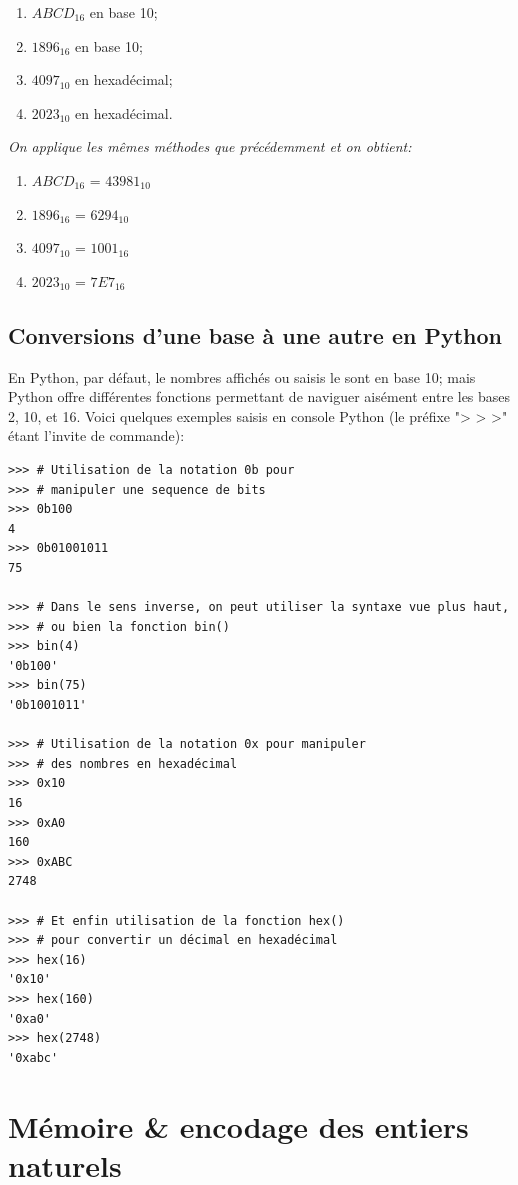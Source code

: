 \documentclass[12pt]{article}
\newenvironment{MaReponse}
		{\begin{greyedtextbox}\itshape} %
		{\end{greyedtextbox}}            %
\newenvironment{alphenum}
{\begin{enumerate}[label=\alph*.]}
	{\end{enumerate}}
\begin{document}
	 \begin{MonExo}
	 	\begin{alphenum}
	 		\item $ABCD_{16}$ en base 10;
	 		\item $1896_{16}$ en base 10;
	 		\item $4097_{10}$ en hexadécimal;
	 		\item $2023_{10}$ en hexadécimal.
	 	\end{alphenum}
	 \end{MonExo}
	 \begin{MaReponse}
	 	On applique les mêmes méthodes que précédemment et on obtient:
		\begin{alphenum}
			\item $ABCD_{16}$ = $43981_{10}$
			\item $1896_{16}$ = $6294_{10}$
			\item $4097_{10}$ = $1001_{16}$
			\item $2023_{10}$ = $7E7_{16}$
		\end{alphenum}
	\end{MaReponse}
	 
	 \subsection{Conversions d'une base à une autre en Python}
	 En Python, par défaut, le nombres affichés ou saisis le sont en base 10; mais Python offre différentes fonctions permettant de naviguer aisément entre les bases 2, 10, et 16. Voici quelques exemples saisis en console Python (le préfixe "> > >" étant l'invite de commande):
	 \begin{verbatim}
>>> # Utilisation de la notation 0b pour 
>>> # manipuler une sequence de bits
>>> 0b100
4
>>> 0b01001011
75

>>> # Dans le sens inverse, on peut utiliser la syntaxe vue plus haut,
>>> # ou bien la fonction bin()
>>> bin(4)
'0b100'
>>> bin(75)
'0b1001011'

>>> # Utilisation de la notation 0x pour manipuler
>>> # des nombres en hexadécimal
>>> 0x10
16
>>> 0xA0
160
>>> 0xABC
2748

>>> # Et enfin utilisation de la fonction hex() 
>>> # pour convertir un décimal en hexadécimal
>>> hex(16)
'0x10'
>>> hex(160)
'0xa0'
>>> hex(2748)
'0xabc'
	 \end{verbatim}
	 
	 \pagebreak
	 
	 \section{Mémoire \& encodage des entiers naturels}
\end{document}
